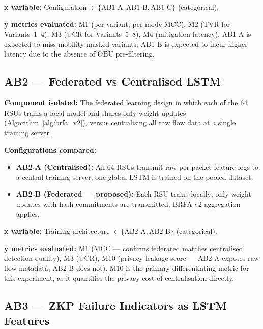 \documentclass[12pt, a4paper]{report}
\begin{document}
{{\textbf{x variable:} Configuration
$\in \{\text{AB1-A}, \text{AB1-B}, \text{AB1-C}\}$ (categorical).

\textbf{y metrics evaluated:} M1 (per-variant, per-mode MCC),
M2 (TVR for Variants~1--4), M3 (UCR for Variants~5--8),
M4 (mitigation latency). AB1-A is expected to miss
mobility-masked variants; AB1-B is expected to incur higher
latency due to the absence of OBU pre-filtering.


\subsection{AB2 — Federated vs Centralised LSTM}
\label{sec:ab2}

\textbf{Component isolated:}
The federated learning design in which each of the 64
\ac{RSU}s trains a local model and shares only weight
updates (Algorithm~\ref{alg:brfa_v2}), versus centralising
all raw flow data at a single training server.

\textbf{Configurations compared:}
\begin{itemize}
    \item \textbf{AB2-A (Centralised):} All 64 RSUs
    transmit raw per-packet feature logs to a central
    training server; one global \ac{LSTM} is trained
    on the pooled dataset.
    \item \textbf{AB2-B (Federated — proposed):}
    Each \ac{RSU} trains locally; only weight updates
    with hash commitments are transmitted; BRFA-v2
    aggregation applies.
\end{itemize}

\textbf{x variable:} Training architecture
$\in \{\text{AB2-A}, \text{AB2-B}\}$ (categorical).

\textbf{y metrics evaluated:} M1 (MCC — confirms federated
matches centralised detection quality), M3 (UCR), M10
(privacy leakage score — AB2-A exposes raw flow metadata,
AB2-B does not). M10 is the primary differentiating metric
for this experiment, as it quantifies the privacy cost of
centralisation directly.


\subsection{AB3 — ZKP Failure Indicators as LSTM Features}
\label{sec:ab3}

}}
\end{document}
